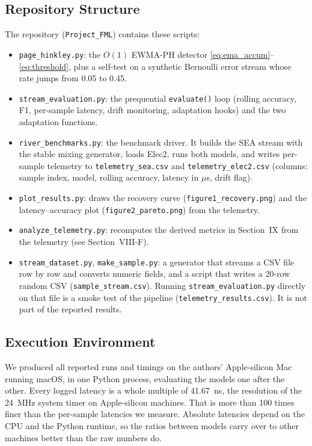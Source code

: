 \documentclass[conference]{IEEEtran}
\begin{document}
\subsection{Repository Structure}
The repository (\texttt{Project\_FML}) contains these scripts:
\begin{itemize}
    \item \texttt{page\_hinkley.py}: the $O(1)$ EWMA-PH detector \eqref{eq:ema_accum}--\eqref{eq:threshold}, plus a self-test on a synthetic Bernoulli error stream whose rate jumps from 0.05 to 0.45.
    \item \texttt{stream\_evaluation.py}: the prequential \texttt{evaluate()} loop (rolling accuracy, F1, per-sample latency, drift monitoring, adaptation hooks) and the two adaptation functions.
    \item \texttt{river\_benchmarks.py}: the benchmark driver. It builds the SEA stream with the stable mixing generator, loads Elec2, runs both models, and writes per-sample telemetry to \texttt{telemetry\_sea.csv} and \texttt{telemetry\_elec2.csv} (columns: sample index, model, rolling accuracy, latency in $\mu$s, drift flag).
    \item \texttt{plot\_results.py}: draws the recovery curve (\texttt{figure1\_recovery.png}) and the latency--accuracy plot (\texttt{figure2\_pareto.png}) from the telemetry.
    \item \texttt{analyze\_telemetry.py}: recomputes the derived metrics in Section~IX from the telemetry (see Section~VIII-F).
    \item \texttt{stream\_dataset.py}, \texttt{make\_sample.py}: a generator that streams a CSV file row by row and converts numeric fields, and a script that writes a 20-row random CSV (\texttt{sample\_stream.csv}). Running \texttt{stream\_evaluation.py} directly on that file is a smoke test of the pipeline (\texttt{telemetry\_results.csv}). It is not part of the reported results.
\end{itemize}

\subsection{Execution Environment}
We produced all reported runs and timings on the authors' Apple-silicon Mac running macOS, in one Python process, evaluating the models one after the other.
Every logged latency is a whole multiple of 41.67~ns, the resolution of the 24~MHz system timer on Apple-silicon machines.
That is more than 100 times finer than the per-sample latencies we measure.
Absolute latencies depend on the CPU and the Python runtime, so the ratios between models carry over to other machines better than the raw numbers do.
\end{document}
